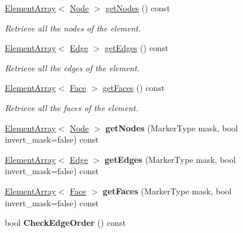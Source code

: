 \begin{DoxyCompactItemize}
\item 
\hyperlink{classINMOST_1_1ElementArray}{Element\-Array}$<$ \hyperlink{classINMOST_1_1Node}{Node} $>$ \hyperlink{classINMOST_1_1Cell_acc265095375df199a083a344d56e4645}{get\-Nodes} () const 
\begin{DoxyCompactList}\small\item\em Retrieve all the nodes of the element. \end{DoxyCompactList}\item 
\hyperlink{classINMOST_1_1ElementArray}{Element\-Array}$<$ \hyperlink{classINMOST_1_1Edge}{Edge} $>$ \hyperlink{classINMOST_1_1Cell_ab0f9c4743826338a4df1b61b69b37c40}{get\-Edges} () const 
\begin{DoxyCompactList}\small\item\em Retrieve all the edges of the element. \end{DoxyCompactList}\item 
\hyperlink{classINMOST_1_1ElementArray}{Element\-Array}$<$ \hyperlink{classINMOST_1_1Face}{Face} $>$ \hyperlink{classINMOST_1_1Cell_a85ccc42adbb161a36a866fcea0f961d2}{get\-Faces} () const 
\begin{DoxyCompactList}\small\item\em Retrieve all the faces of the element. \end{DoxyCompactList}\item 
\hypertarget{classINMOST_1_1Cell_a3ad5728090b1780f5c4226e5f73756f9}{\hyperlink{classINMOST_1_1ElementArray}{Element\-Array}$<$ \hyperlink{classINMOST_1_1Node}{Node} $>$ {\bfseries get\-Nodes} (Marker\-Type mask, bool invert\-\_\-mask=false) const }\label{classINMOST_1_1Cell_a3ad5728090b1780f5c4226e5f73756f9}

\item 
\hypertarget{classINMOST_1_1Cell_a93e527e5b5006011c78b0cd541129660}{\hyperlink{classINMOST_1_1ElementArray}{Element\-Array}$<$ \hyperlink{classINMOST_1_1Edge}{Edge} $>$ {\bfseries get\-Edges} (Marker\-Type mask, bool invert\-\_\-mask=false) const }\label{classINMOST_1_1Cell_a93e527e5b5006011c78b0cd541129660}

\item 
\hypertarget{classINMOST_1_1Cell_a631a1c2f3e429ecd32f7d8c60ee5b9c0}{\hyperlink{classINMOST_1_1ElementArray}{Element\-Array}$<$ \hyperlink{classINMOST_1_1Face}{Face} $>$ {\bfseries get\-Faces} (Marker\-Type mask, bool invert\-\_\-mask=false) const }\label{classINMOST_1_1Cell_a631a1c2f3e429ecd32f7d8c60ee5b9c0}

\item 
\hypertarget{classINMOST_1_1Cell_afc84112c4d1f84b15799ffb91615cd30}{bool {\bfseries Check\-Edge\-Order} () const }\label{classINMOST_1_1Cell_afc84112c4d1f84b15799ffb91615cd30}


\end{DoxyCompactItemize}
